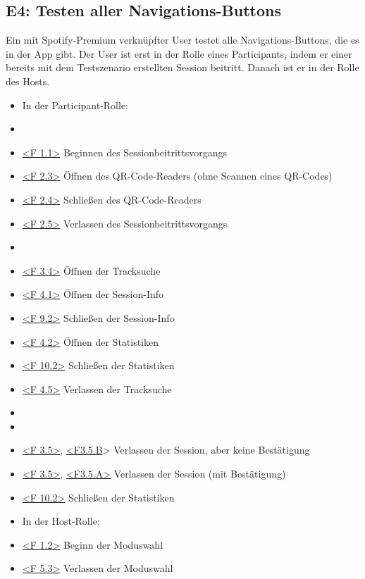 \documentclass[oneside, ngerman]{sdqtechreport}
\begin{document}
\subsection{E4: Testen aller Navigations-Buttons}
\label{subsec:Tests:ErweiterteTestszenarien:E4}
Ein mit Spotify-Premium verknüpfter User testet alle Navigations-Buttons, die es in der App gibt. Der User ist erst in der Rolle eines Participants, indem er einer bereits mit dem Testszenario \gOne erstellten Session beitritt. Danach ist er in der Rolle des Hosts.
\begin{itemize}
    \item In der Participant-Rolle:
    \item \gNine
    \item \hyperlink{<F 1.1>}{<F 1.1>} Beginnen des Sessionbeitrittsvorgangs
    \item \hyperlink{<F 2.3>}{<F 2.3>} Öffnen des QR-Code-Readers (ohne Scannen eines QR-Codes)
    \item \hyperlink{<F 2.4>}{<F 2.4>} Schließen des QR-Code-Readers
    \item \hyperlink{<F 2.5>}{<F 2.5>} Verlassen des Sessionbeitrittsvorgangs
    \item \gTwo
    \item \hyperlink{<F 3.4>}{<F 3.4>} Öffnen der Tracksuche
    \item \hyperlink{<F 4.1>}{<F 4.1>} Öffnen der Session-Info
    \item \hyperlink{<F 9.2>}{<F 9.2>} Schließen der Session-Info
    \item \hyperlink{<F 4.2>}{<F 4.2>} Öffnen der Statistiken
    \item \hyperlink{<F 10.2>}{<F 10.2>} Schließen der Statistiken
    \item \hyperlink{<F 4.5>}{<F 4.5>} Verlassen der Tracksuche
    \item \gTen
    \item \gEleven
    \item \hyperlink{<F 3.5>}{<F 3.5>}, \hyperlink{<F3.5.B}{<F3.5.B}> Verlassen der Session, aber keine Bestätigung
    \item \hyperlink{<F 3.5>}{<F 3.5>}, \hyperlink{<F3.5.A>}{<F3.5.A>} Verlassen der Session (mit Bestätigung)
    \item \hyperlink{<F 10.2>}{<F 10.2>} Schließen der Statistiken
    \item In der Host-Rolle:
    \item \hyperlink{<F 1.2>}{<F 1.2>} Beginn der Moduswahl
    \item \hyperlink{<F 5.3>}{<F 5.3>} Verlassen der Moduswahl

\end{itemize}
\end{document}

